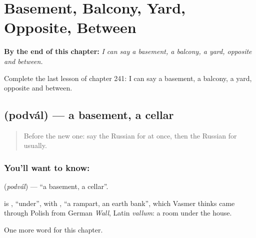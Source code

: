 
\chapter{Basement, Balcony, Yard, Opposite, Between}
\label{ch:ru-basement-balcony-yard-opposite-between}

\begin{chapteropening}
\textbf{By the end of this chapter:} \emph{I can say a basement, a balcony, a yard, opposite and between.}

Complete the last lesson of chapter 241: I can say a basement, a balcony, a yard, opposite and between.
\end{chapteropening}

\section[\texorpdfstring{\ru{подвал} (podvál)}{подвал (podvál)}]{ (podvál) — a basement, a cellar}

\label{lesson:RU-C241-podval}



\begin{quote}
Before the new one: say the Russian for at once, then the Russian for usually.
\end{quote}

\subsection*{You'll want to know: }
\textbf{} (\emph{podvál}) — \textquotedblleft{}a basement, a cellar\textquotedblright{}.

\begin{cousinweb}
\textbf{} is \emph{}, \textquotedblleft{}under\textquotedblright{}, with \emph{}, \textquotedblleft{}a rampart, an earth bank\textquotedblright{}, which Vasmer thinks came through Polish from German \emph{Wall}, Latin \emph{vallum}: a room under the house.
\end{cousinweb}

\begin{grammarlens}[title={What you've built}]
One more word for this chapter.
\end{grammarlens}

